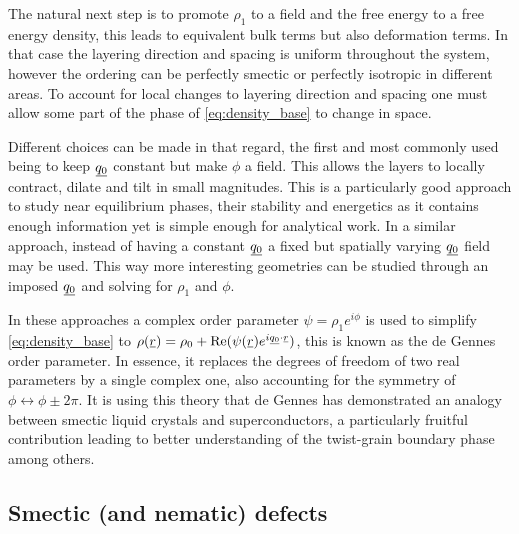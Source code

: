 \documentclass[12pt]{article}
\newcommand{\suf}[2]{\stackunder[1pt]{\ensuremath{#1}}{\rule{\widthof{\ensuremath{#2}}*\real{0.9}}{.1ex}}}
\newcommand{\su}[1]{\suf{#1}{#1}}
\newcommand{\ssu}[1]{\scriptsize\su{#1}\normalsize}
\begin{document}

The natural next step is to promote $\rho_1$ to a field and the free energy to a free energy density, this leads to equivalent bulk terms but also deformation terms.
In that case the layering direction and spacing is uniform throughout the system, however the ordering can be perfectly smectic or perfectly isotropic in different areas.
To account for local changes to layering direction and spacing one must allow some part of the phase of \cref{eq:density_base} to change in space.

Different choices can be made in that regard, the first and most commonly used being to keep $\su{q_0}$ constant but make $\phi$ a field.
This allows the layers to locally contract, dilate and tilt in small magnitudes.
This is a particularly good approach to study near equilibrium phases, their stability and energetics as it contains enough information yet is simple enough for analytical work.
In a similar approach, instead of having a constant $\su{q_0}$ a fixed but spatially varying $\su{q_0}$ field may be used.
This way more interesting geometries can be studied through an imposed $\su{q_0}$ and solving for $\rho_1$ and $\phi$.

In these approaches a complex order parameter $\psi=\rho_1e^{i\phi}$ is used to simplify \cref{eq:density_base} to $\rho(\su{r}) = \rho_0 + \Re(\psi(\su{r}) e^{i\ssu{q_0}\cdot\ssu{r}})$, this is known as the de Gennes order parameter.
In essence, it replaces the degrees of freedom of two real parameters by a single complex one, also accounting for the symmetry of $\phi \leftrightarrow \phi \pm 2\pi$.
It is using this theory that de Gennes has demonstrated an analogy between smectic liquid crystals and superconductors\cite{degennesAnalogySuperconductorsSmectics1972}, a particularly fruitful contribution leading to better understanding of the twist-grain boundary phase\cite{lubenskyTwistgrainboundaryPhasesNematic1990} among others.

\subsection{Smectic (and nematic) defects}
\end{document}
